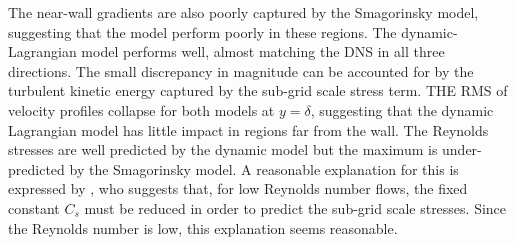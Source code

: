 \documentclass[12pt,oneside,a4paper]{article}
\begin{document}
The near-wall gradients are also poorly captured by the Smagorinsky model, suggesting that the model perform poorly in these regions. The dynamic-Lagrangian model performs well, almost matching the DNS in all three directions. The small discrepancy in magnitude can be accounted for by the turbulent kinetic energy captured by the sub-grid scale stress term. THE RMS of velocity profiles collapse for both models at $y=\delta$, suggesting that the dynamic Lagrangian model has little impact in regions far from the wall. The Reynolds stresses are well predicted by the dynamic model but the maximum is under-predicted by the Smagorinsky model. A reasonable explanation for this is expressed by \cite{pope2001}, who suggests that, for low Reynolds number flows, the fixed constant $C_s$ must be reduced in order to predict the sub-grid scale stresses. Since the Reynolds number is low, this explanation seems reasonable.
\end{document}
